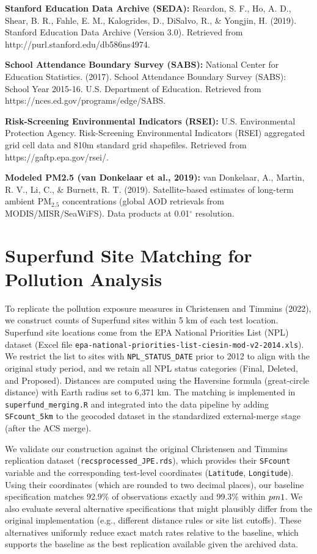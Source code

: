 \documentclass{article}
\begin{document}
\textbf{Stanford Education Data Archive (SEDA):}
Reardon, S. F., Ho, A. D., Shear, B. R., Fahle, E. M., Kalogrides, D., DiSalvo, R., \& Yongjin, H. (2019).
Stanford Education Data Archive (Version 3.0). Retrieved from http://purl.stanford.edu/db586ns4974.

\textbf{School Attendance Boundary Survey (SABS):}
National Center for Education Statistics. (2017). School Attendance Boundary Survey (SABS): School Year 2015-16. U.S. Department of Education. Retrieved from https://nces.ed.gov/programs/edge/SABS.

\textbf{Risk-Screening Environmental Indicators (RSEI):}
U.S. Environmental Protection Agency. Risk-Screening Environmental Indicators (RSEI) aggregated grid cell data and 810m standard grid shapefiles. Retrieved from https://gaftp.epa.gov/rsei/.

\textbf{Modeled PM2.5 (van Donkelaar et al., 2019):}
van Donkelaar, A., Martin, R. V., Li, C., \& Burnett, R. T. (2019). Satellite-based estimates of long-term ambient PM$_{2.5}$ concentrations (global AOD retrievals from MODIS/MISR/SeaWiFS). Data products at 0.01$^\circ$ resolution.

\section{Superfund Site Matching for Pollution Analysis}

To replicate the pollution exposure measures in Christensen and Timmins (2022), we construct counts of Superfund sites within 5 km of each test location. Superfund site locations come from the EPA National Priorities List (NPL) dataset (Excel file \texttt{epa-national-priorities-list-ciesin-mod-v2-2014.xls}). We restrict the list to sites with \texttt{NPL\_STATUS\_DATE} prior to 2012 to align with the original study period, and we retain all NPL status categories (Final, Deleted, and Proposed). Distances are computed using the Haversine formula (great-circle distance) with Earth radius set to 6,371 km. The matching is implemented in \texttt{superfund\_merging.R} and integrated into the data pipeline by adding \texttt{SFcount\_5km} to the geocoded dataset in the standardized external-merge stage (after the ACS merge).

We validate our construction against the original Christensen and Timmins replication dataset (\texttt{recsprocessed\_JPE.rds}), which provides their \texttt{SFcount} variable and the corresponding test-level coordinates (\texttt{Latitude}, \texttt{Longitude}). Using their coordinates (which are rounded to two decimal places), our baseline specification matches 92.9\% of observations exactly and 99.3\% within $\\pm 1$. We also evaluate several alternative specifications that might plausibly differ from the original implementation (e.g., different distance rules or site list cutoffs). These alternatives uniformly reduce exact match rates relative to the baseline, which supports the baseline as the best replication available given the archived data.
\end{document}
